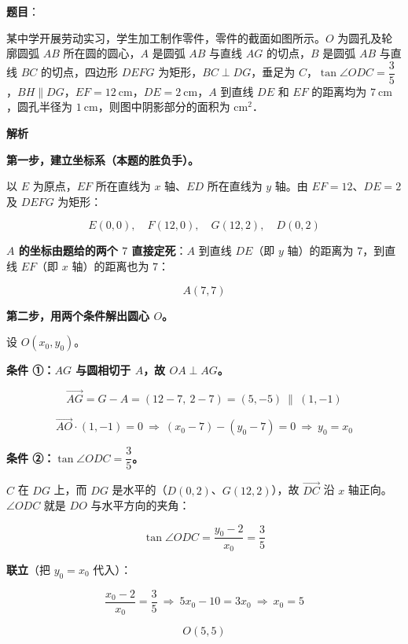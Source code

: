 \begin{answer}

\textbf{题目}：

某中学开展劳动实习，学生加工制作零件，零件的截面如图所示。$O$ 为圆孔及轮廓圆弧 $AB$ 所在圆的圆心，$A$ 是圆弧 $AB$ 与直线 $AG$ 的切点，$B$ 是圆弧 $AB$ 与直线 $BC$ 的切点，四边形 $DEFG$ 为矩形，$BC\perp DG$，垂足为 $C$，$\tan\angle ODC=\dfrac35$，$BH\parallel DG$，$EF=12\ \mathrm{cm}$，$DE=2\ \mathrm{cm}$，$A$ 到直线 $DE$ 和 $EF$ 的距离均为 $7\ \mathrm{cm}$，圆孔半径为 $1\ \mathrm{cm}$，则图中阴影部分的面积为 \gkblank{} $\mathrm{cm}^{2}$．
\nopagebreak[4]
\begin{center}\end{center}
\nopagebreak[4]
\textbf{解析}

\textbf{第一步，建立坐标系（本题的胜负手）。}

以 $E$ 为原点，$EF$ 所在直线为 $x$ 轴、$ED$ 所在直线为 $y$ 轴。由 $EF=12$、$DE=2$ 及 $DEFG$ 为矩形：

\nopagebreak[4]
\[E(0,0),\quad F(12,0),\quad G(12,2),\quad D(0,2)\]

\textbf{$A$ 的坐标由题给的两个 $7$ 直接定死}：$A$ 到直线 $DE$（即 $y$ 轴）的距离为 $7$，到直线 $EF$（即 $x$ 轴）的距离也为 $7$：

\nopagebreak[4]
\[A(7,7)\]

\textbf{第二步，用两个条件解出圆心 $O$。}

设 $O\left(x_0,y_0\right)$。

\textbf{条件 ①：$AG$ 与圆相切于 $A$，故 $OA\perp AG$。}

\nopagebreak[4]
\[\overrightarrow{AG}=G-A=(12-7,\ 2-7)=(5,-5)\ \parallel\ (1,-1)\]

\nopagebreak[4]
\[\overrightarrow{AO}\cdot(1,-1)=0\ \Longrightarrow\ \left(x_0-7\right)-\left(y_0-7\right)=0\ \Longrightarrow\ y_0=x_0\]

\textbf{条件 ②：$\tan\angle ODC=\dfrac35$。}

$C$ 在 $DG$ 上，而 $DG$ 是水平的（$D(0,2)$、$G(12,2)$），故 $\overrightarrow{DC}$ 沿 $x$ 轴正向。$\angle ODC$ 就是 $DO$ 与水平方向的夹角：

\nopagebreak[4]
\[\tan\angle ODC=\frac{y_0-2}{x_0}=\frac35\]

\textbf{联立}（把 $y_0=x_0$ 代入）：

\nopagebreak[4]
\[\frac{x_0-2}{x_0}=\frac35\ \Longrightarrow\ 5x_0-10=3x_0\ \Longrightarrow\ x_0=5\]

\nopagebreak[4]
\[\boxed{O(5,5)}\]


\end{answer}
